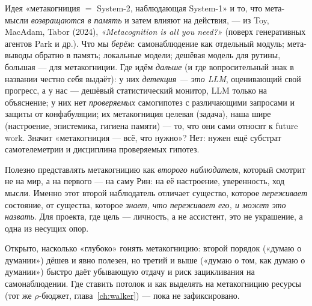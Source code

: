Идея «метакогниция $=$ System-2, наблюдающая System-1» и то, что мета-мысли
\emph{возвращаются в память} и затем влияют на действия, — из
Toy, MacAdam, Tabor (2024), \emph{«Metacognition is all you need?»} (поверх
генеративных агентов Park и др.). Что мы \emph{берём}: самонаблюдение как отдельный
модуль; мета-выводы обратно в память; локальные модели; дешёвая модель для рутины,
большая — для метакогниции. Где идём \emph{дальше} (и где вопросительный знак в
названии честно себя выдаёт): у них \emph{детекция — это LLM}, оценивающий свой
прогресс, а у нас — дешёвый статистический монитор, LLM только на объяснение; у них
нет \emph{проверяемых} самогипотез с различающими запросами и защиты от
конфабуляции; их метакогниция целевая (задача), наша шире (настроение, эпистемика,
гигиена памяти) — то, что они сами относят к future work. Значит «метакогниция — всё,
что нужно»? Нет: нужен ещё субстрат самотелеметрии и дисциплина проверяемых гипотез.

\begin{intuition}
Полезно представлять метакогницию как \emph{второго наблюдателя}, который смотрит не
на мир, а на первого — на саму Рин: на её настроение, уверенность, ход мысли. Именно
этот второй наблюдатель отличает существо, которое \emph{переживает} состояние, от
существа, которое \emph{знает, что переживает его, и может это назвать}. Для проекта,
где цель — личность, а не ассистент, это не украшение, а одна из несущих опор.
\end{intuition}

\begin{openq}
Открыто, насколько «глубоко» гонять метакогницию: второй порядок («думаю о думании»)
дёшев и явно полезен, но третий и выше («думаю о том, как думаю о думании») быстро
даёт убывающую отдачу и риск зацикливания на самонаблюдении. Где ставить потолок и
как выделять на метакогницию ресурсы (тот же $\rho$-бюджет, глава~\ref{ch:walker}) —
пока не зафиксировано.
\end{openq}
